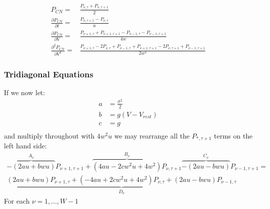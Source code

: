 \documentclass[10pt]{article}
\begin{document}
\begin{eqnarray}
    P_{CN} =& \frac{P_{\nu,\tau} + P_{\nu,\tau + 1}}{2} \\
    \frac{\partial P_{CN}}{\partial t} =& \frac{P_{\nu,\tau +1 } -
    P_{\nu,\tau}}{u} \\
    \frac{\partial P_{CN}}{\partial V} =&
    \frac{P_{\nu +1,\tau } + P_{\nu +1,\tau +1 } -
    P_{\nu - 1,\tau } - P_{\nu -1,\tau +1}} 
    {4w} \\
    \frac{\partial^2 P_{CN}}{\partial V^2} =&
    \frac{P_{\nu+1,\tau} - 2 P_{\nu,\tau} + P_{\nu-1,\tau} +
    P_{\nu+1,\tau+1} - 2 P_{\nu,\tau+1} + P_{\nu-1,\tau+1}}
    {2w^2} 
\end{eqnarray}

\subsubsection{Tridiagonal Equations}

If we now let:
\begin{align*}
a &= \frac{\sigma^2}{2} \\
b &= g(V - V_{rest}) \\
c &= g \\
\end{align*}
and multiply throughout with $4w^2u$
we may rearrange all the $P_{*,\tau+1} $ terms on the left hand side:
\begin{multline}
    \overbrace{-(2au+bwu)}^{A_\nu} P_{\nu+1,\tau+1} + 
    \overbrace{(4au - 2cw^2u + 4w^2)}^{B_\nu} P_{\nu,\tau+1}
    \overbrace{-(2au-bwu)}^{C_\nu} P_{\nu-1,\tau+1}
    =  \\
    \underbrace{(2au+bwu) P_{\nu+1,\tau} +  
    (-4au +2cw^2u + 4w^2) P_{\nu,\tau} + 
    (2au-bwu) P_{\nu-1,\tau}}_{D_{\nu}}
    \label{rearrange}
\end{multline}
For each $ \nu = 1 , \dots , W-1 $
\end{document}
